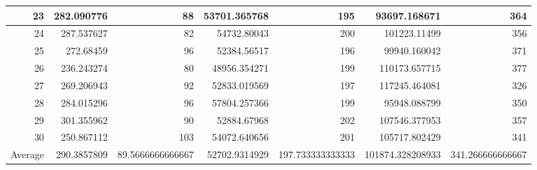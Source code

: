 \begin{table}
\begin{adjustwidth}{}{}
{{\begin{tabular}{|r|r|r|r|r|r|r|}
	\hline
	23                                         & 282.090776                   & 88                                    & 53701.365768                   & 195                                   & 93697.168671                 & 364                                    \\ 
	\hline
	24                                         & 287.537627                   & 82                                    & 54732.80043                    & 200                                   & 101223.11499                 & 356                                    \\ 
	\hline
	25                                         & 272.68459                    & 96                                    & 52384.56517                    & 196                                   & 99940.160042                 & 371                                    \\ 
	\hline
	26                                         & 236.243274                   & 80                                    & 48956.354271                   & 199                                   & 110173.657715                & 377                                    \\ 
	\hline
	27                                         & 269.206943                   & 92                                    & 52833.019569                   & 197                                   & 117245.464081                & 326                                    \\ 
	\hline
	28                                         & 284.015296                   & 96                                    & 57804.257366                   & 199                                   & 95948.088799                 & 350                                    \\ 
	\hline
	29                                         & 301.355962                   & 90                                    & 52884.67968                    & 202                                   & 107546.377953                & 357                                    \\ 
	\hline
	30                                         & 250.867112                   & 103                                   & 54072.640656                   & 201                                   & 105717.802429                & 341                                    \\ 
	\hline
	\multicolumn{1}{|l|}{Average}              & 290.3857809                  & 89.5666666666667                      & 52702.9314929                  & 197.733333333333                      & 101874.328208933             & 341.266666666667                       \\ 

\end{tabular}}}
\end{adjustwidth}
\end{table}
